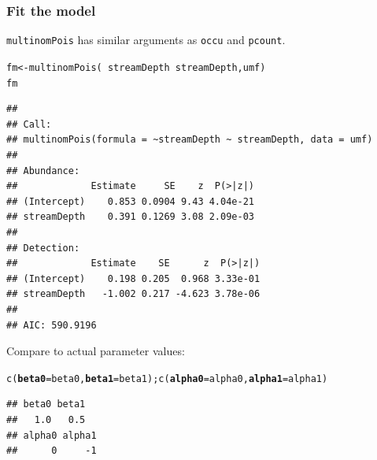 \documentclass[color=usenames,dvipsnames]{beamer}\usepackage[]{graphicx}\usepackage[]{color}
\makeatletter
\newcommand{\hlopt}[1]{\textcolor[rgb]{0,0,0}{#1}}%
\newcommand{\hlstd}[1]{\textcolor[rgb]{0,0,0}{#1}}%
\newcommand{\hlkwb}[1]{\textcolor[rgb]{0,0.341,0.682}{#1}}%
\newcommand{\hlkwc}[1]{\textcolor[rgb]{0,0,0}{\textbf{#1}}}%
\newcommand{\hlkwd}[1]{\textcolor[rgb]{0.004,0.004,0.506}{#1}}%
\newenvironment{kframe}{%
 \def\at@end@of@kframe{}%
 \ifinner\ifhmode%
  \def\at@end@of@kframe{\end{minipage}}%
  \begin{minipage}{\columnwidth}%
 \fi\fi%
 \def\FrameCommand##1{\hskip\@totalleftmargin \hskip-\fboxsep
 \colorbox{shadecolor}{##1}\hskip-\fboxsep
     \hskip-\linewidth \hskip-\@totalleftmargin \hskip\columnwidth}%
 \MakeFramed {\advance\hsize-\width
   \@totalleftmargin\z@ \linewidth\hsize
   \@setminipage}}%
 {\par\unskip\endMakeFramed%
 \at@end@of@kframe}
\newenvironment{knitrout}{}{} %
\newcommand{\inr}[1]{\colorbox{inlinecolor}{\texttt{#1}}}
\makeatother
\begin{document}
\begin{frame}[fragile]
  \frametitle{Fit the model}
  \footnotesize
  \inr{multinomPois} has similar arguments as \inr{occu} and
  \inr{pcount}. 
\begin{knitrout}\tiny
{}\color{fgcolor}\begin{kframe}
\begin{alltt}
\hlstd{fm} \hlkwb{<-} \hlkwd{multinomPois}\hlstd{(}\hlopt{~}\hlstd{streamDepth} \hlopt{~}\hlstd{streamDepth, umf)}
\hlstd{fm}
\end{alltt}
\begin{verbatim}
## 
## Call:
## multinomPois(formula = ~streamDepth ~ streamDepth, data = umf)
## 
## Abundance:
##             Estimate     SE    z  P(>|z|)
## (Intercept)    0.853 0.0904 9.43 4.04e-21
## streamDepth    0.391 0.1269 3.08 2.09e-03
## 
## Detection:
##             Estimate    SE      z  P(>|z|)
## (Intercept)    0.198 0.205  0.968 3.33e-01
## streamDepth   -1.002 0.217 -4.623 3.78e-06
## 
## AIC: 590.9196
\end{verbatim}
\end{kframe}
\end{knitrout}
\pause
\vfill
Compare to actual parameter values:
\vspace{-6pt}
\begin{knitrout}\tiny
{}\color{fgcolor}\begin{kframe}
\begin{alltt}
\hlkwd{c}\hlstd{(}\hlkwc{beta0}\hlstd{=beta0,} \hlkwc{beta1}\hlstd{=beta1);} \hlkwd{c}\hlstd{(}\hlkwc{alpha0}\hlstd{=alpha0,} \hlkwc{alpha1}\hlstd{=alpha1)}
\end{alltt}
\begin{verbatim}
## beta0 beta1 
##   1.0   0.5
## alpha0 alpha1 
##      0     -1
\end{verbatim}
\end{kframe}
\end{knitrout}
\end{frame}
\end{document}
